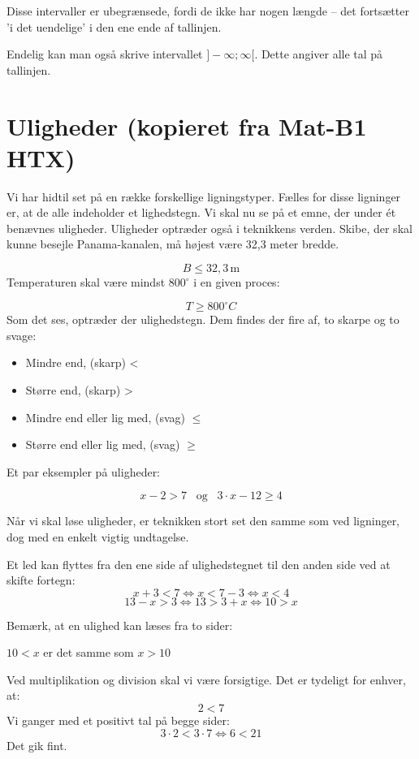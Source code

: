 \documentclass[12pt,oneside,a4paper]{article}
\begin{document}
Disse intervaller er ubegrænsede, fordi de ikke har nogen længde – det
fortsætter ’i det uendelige’ i den ene ende af tallinjen.

Endelig kan man også skrive intervallet $]-\infty ;\infty [$. Dette angiver
alle tal på tallinjen.

\section{Uligheder (kopieret fra Mat-B1 HTX)}
Vi har hidtil set på en række forskellige ligningstyper. Fælles for disse
ligninger er, at de alle indeholder et lighedstegn. Vi skal nu se på et emne,
der under ét benævnes uligheder. Uligheder optræder også i teknikkens verden.
Skibe, der skal kunne besejle Panama-kanalen, må højest være 32,3 meter bredde.

$$
B\leq 32,3 \, \text{m}
$$
Temperaturen skal være mindst $800^\circ$ i en given proces:


$$
T \geq 800 ^\circ C
$$
Som det ses, optræder der ulighedstegn. Dem findes der fire af, to skarpe og to svage:

\begin{itemize}
    \item Mindre end, (skarp)  <
    \item Større end, (skarp) >
    \item Mindre end eller lig med, (svag) $\leq$
    \item Større end eller lig med, (svag) $\geq$
\end{itemize}

Et par eksempler på uligheder:

$$
x-2>7 \;\;\; \text{og} \;\;\; 3\cdot x-12\geq 4
$$

Når vi skal løse uligheder, er teknikken stort set den samme som ved ligninger, dog med en enkelt vigtig undtagelse.

Et led kan flyttes fra den ene side af ulighedstegnet til den anden side ved at skifte fortegn:
$$
x+3<7 \Leftrightarrow x<7-3 \Leftrightarrow x<4
$$
$$
13-x>3 \Leftrightarrow 13>3+x \Leftrightarrow 10>x
$$

Bemærk, at en ulighed kan læses fra to sider:

$10 < x$ er det samme som $x > 10$

Ved multiplikation og division skal vi være forsigtige. Det er tydeligt for enhver, at:
$$
2<7
$$
Vi ganger med et positivt tal på begge sider:
$$
3 \cdot 2 <3 \cdot 7 \Leftrightarrow 6<21
$$
Det gik fint.
\end{document}
